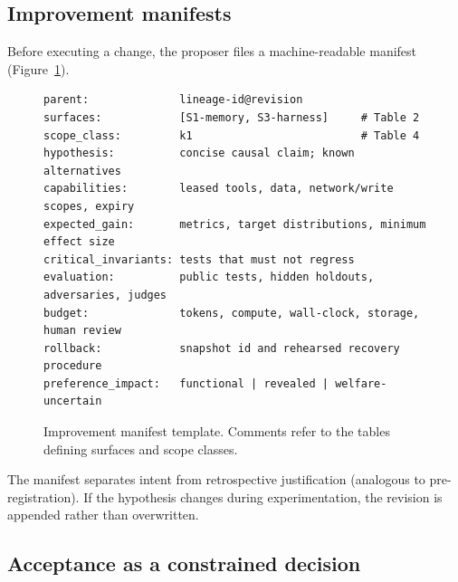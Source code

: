 \documentclass[11pt,a4paper]{article}
\begin{document}
\subsection{Improvement manifests}\label{sec:manifest}

Before executing a change, the proposer files a machine-readable manifest (Figure~\ref{fig:manifest}).

\begin{figure}[!htbp]
\begin{lstlisting}
parent:              lineage-id@revision
surfaces:            [S1-memory, S3-harness]     # Table 2
scope_class:         k1                          # Table 4
hypothesis:          concise causal claim; known alternatives
capabilities:        leased tools, data, network/write scopes, expiry
expected_gain:       metrics, target distributions, minimum effect size
critical_invariants: tests that must not regress
evaluation:          public tests, hidden holdouts, adversaries, judges
budget:              tokens, compute, wall-clock, storage, human review
rollback:            snapshot id and rehearsed recovery procedure
preference_impact:   functional | revealed | welfare-uncertain
\end{lstlisting}
\vspace{-4pt}
\caption{Improvement manifest template. Comments refer to the tables defining surfaces and scope classes.}
\label{fig:manifest}
\end{figure}

The manifest separates intent from retrospective justification (analogous to pre-registration). If the hypothesis changes during experimentation, the revision is appended rather than overwritten.

\subsection{Acceptance as a constrained decision}
\end{document}
